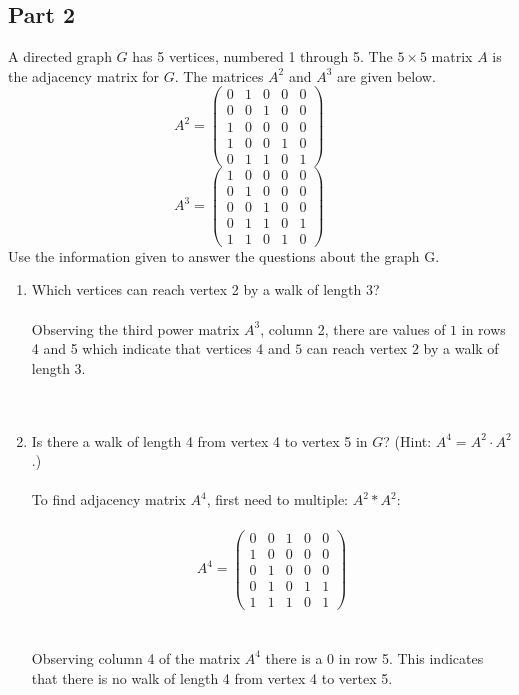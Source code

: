 \documentclass{amsart}
\theoremstyle{definition}
\theoremstyle{Exercise}
\theoremstyle{remark}
\theoremstyle{rule}
\numberwithin{equation}{section}
\begin{document}
\subsection*{Part 2}
A directed graph $G$ has 5 vertices, numbered 1 through 5. The $5\times 5$ matrix $A$ is the adjacency matrix for $G$. The matrices $A^2$ and $A^3$ are given below.
\[
A^2  = \left( \begin{array}{ccccc}
0 & 1 & 0 & 0 & 0 \\
0 & 0 & 1 & 0 & 0\\
1 & 0 & 0 & 0 & 0\\
1 & 0 & 0 & 1 & 0\\
0 & 1 & 1 & 0 & 1
\end{array} \right)~~~~~~~
\]
\[
A^3  = \left( \begin{array}{ccccc}
1 & 0 & 0 & 0 & 0 \\
0 & 1 & 0 & 0 & 0\\
0 & 0 & 1 & 0 & 0\\
0 & 1 & 1 & 0 & 1\\
1 & 1 & 0 & 1 & 0
\end{array} \right)~~~~~~~
\]
Use the information given to answer the questions about the graph G.
\newpage
\vspace*{0.25in}
\begin{enumerate}[label=(\alph*)]
\item Which vertices can reach vertex 2 by a walk of length 3?\\\\
Observing the third power matrix $A^3$, column 2, there are values of $1$ in rows 4 and 5 which indicate that vertices $4$ and $5$ can reach vertex $2$ by a walk of length 3.\\
\\\\

\item Is there a walk of length 4 from vertex 4 to vertex 5 in $G$? (Hint: $A^4 = A^2\cdot A^2$.)\\\\
To find adjacency matrix $A^4$, first need to multiple: $A^2 * A^2$:\\\\
\[
A^4  = \left( \begin{array}{ccccc}
0 & 0 & 1 & 0 & 0 \\
1 & 0 & 0 & 0 & 0\\
0 & 1 & 0 & 0 & 0\\
0 & 1 & 0 & 1 & 1\\
1 & 1 & 1 & 0 & 1
\end{array} \right)
\]
\\\\
Observing column 4 of the matrix $A^4$ there is a $0$ in row 5. This indicates that there is no walk of length 4 from vertex 4 to vertex 5.\\
\end{enumerate}
\end{document}
